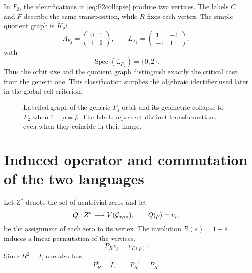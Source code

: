 \documentclass[11pt]{amsart}
\theoremstyle{definition}
\theoremstyle{remark}
\begin{document}
In $F_2$, the identifications in \eqref{eq:F2collapse} produce two vertices. The labels $C$ and $F$ describe the same transposition, while $R$ fixes each vertex. The simple quotient graph is $K_2$:
\begin{equation}
A_{F_2}=\begin{pmatrix}0&1\\1&0\end{pmatrix},\qquad
L_{F_2}=\begin{pmatrix}1&-1\\-1&1\end{pmatrix},
\end{equation}
with
\begin{equation}
 \operatorname{Spec}(L_{F_2})=\{0,2\}.
\end{equation}
Thus the orbit size and the quotient graph distinguish exactly the critical case from the generic one. This classification supplies the algebraic identifier used later in the global cell criterion.

\begin{figure}[t]
\centering
{}
\caption{Labelled graph of the generic $F_4$ orbit and its geometric collapse to $F_2$ when $1-\rho=\bar\rho$. The labels represent distinct transformations even when they coincide in their image.}
\label{fig:symgraph}
\end{figure}

\section{Induced operator and commutation of the two languages}
Let $Z^*$ denote the set of nontrivial zeros and let
\[
Q:Z^*\longrightarrow V(\mathcal G_{\rm sym}),\qquad Q(\rho)=v_{\rho},
\]
be the assignment of each zero to its vertex. The involution $R(s)=1-\overline{s}$ induces a linear permutation of the vertices,
\begin{equation}\label{eq:PR}
P_R v_{\rho}=v_{R(\rho)}.
\end{equation}
Since $R^2=I$, one also has
\begin{equation}
P_R^2=I,\qquad P_R^{-1}=P_R.
\end{equation}
\end{document}
